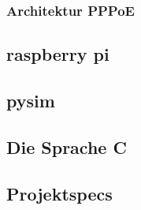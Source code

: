 \subsubsection{Architektur PPPoE}

\subsection{raspberry pi}

\subsection{pysim}

\subsection{Die Sprache C}

\subsection{Projektspecs}

